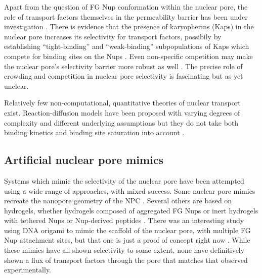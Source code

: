 Apart from the question of FG Nup conformation within the nuclear pore, the role of transport factors themselves in the permeability barrier has been under investigation \cite{kapinos18,kapinos17,schleicher14,kapinos14}.  There is evidence that the presence of karyopherins (Kaps) in the nuclear pore increases its selectivity for transport factors, possibily by establishing ``tight-binding'' and ``weak-binding'' subpopulations of Kaps which compete for binding sites on the Nups \cite{wagner15}.  Even non-specific ompetition may make the nuclear pore's selectivity barrier more robust as well \cite{tetenbaum-novatt12,zilman09,zilman10,timney06}.  The precise role of crowding and competition in nuclear pore selectivity is fascinating but as yet unclear.


Relatively few non-computational, quantitative theories of nuclear transport exist.  Reaction-diffusion models have been proposed with varying degrees of complexity and different underlying assumptions but they do not take both binding kinetics and binding site saturation into account \cite{yang18,zilman07}.




\subsection{Artificial nuclear pore mimics}

Systems which mimic the selectivity of the nuclear pore have been attempted using a wide range of approaches, with mixed success.  Some nuclear pore mimics recreate the nanopore geometry of the NPC \cite{jovanovic-talisman09,ananth18a}.  Several others are based on hydrogels, whether hydrogels composed of aggregated FG Nups \cite{frey07,ader10, kim15} or inert hydrogels with tethered Nups or Nup-derived peptides \cite{yang18,friedman16a}.  There was an interesting study using DNA origami to mimic the scaffold of the nuclear pore, with multiple FG Nup attachment sites, but that one is just a proof of concept right now \cite{fisher18}.  While these mimics have all shown selectivity to some extent, none have definitively shown a flux of transport factors through the pore that matches that observed experimentally.  

